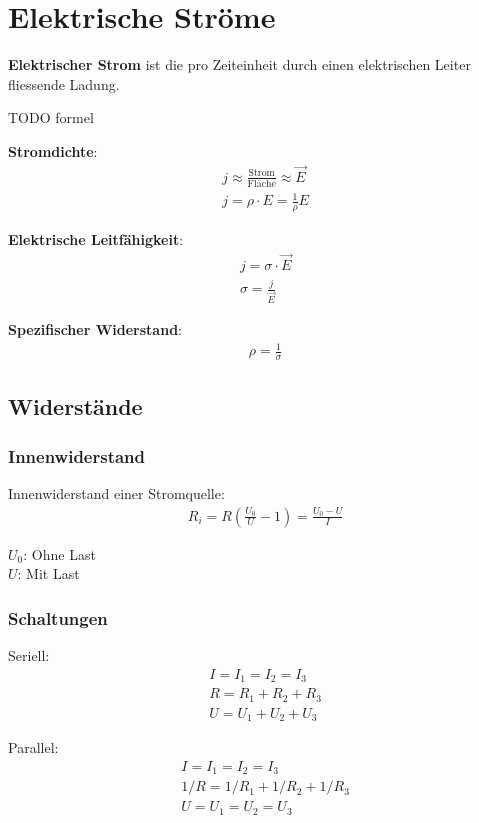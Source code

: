 \section{Elektrische Ströme}

\textbf{Elektrischer Strom} ist die pro Zeiteinheit durch einen elektrischen Leiter
fliessende Ladung.

TODO formel

\textbf{Stromdichte}:
\begin{align*}
	& j \approx \frac{\textrm{Strom}}{\textrm{Fläche}} \approx \vec{E} \\
	& j = \rho \cdot E = \frac{1}{\rho}E
\end{align*}

\textbf{Elektrische Leitfähigkeit}:
\begin{align*}
	& j = \sigma \cdot \vec{E} \\
	& \sigma = \frac{j}{\vec{E}}
\end{align*}

\textbf{Spezifischer Widerstand}:
\begin{align*}
	& \rho = \frac{1}{\sigma}
\end{align*}

\subsection{Widerstände}

\subsubsection{Innenwiderstand}

Innenwiderstand einer Stromquelle:
\begin{align*}
	& R_i = R \left(\frac{U_0}{U} - 1\right) = \frac{U_0 - U}{I}
\end{align*}

$U_0$: Ohne Last\\
$U$: Mit Last

\subsubsection{Schaltungen}

\begin{minipage}[t]{.5\linewidth}
	Seriell:
	\begin{align*}
		& I = I_1 = I_2 = I_3 \\
		& R = R_1 + R_2 + R_3 \\
		& U = U_1 + U_2 + U_3
	\end{align*}
	
\end{minipage}
\begin{minipage}[t]{.5\linewidth}
	Parallel:
	\begin{align*}
		& I = I_1 = I_2 = I_3 \\
		& 1/R = 1/R_1 + 1/R_2 + 1/R_3 \\
		& U = U_1 = U_2 = U_3
	\end{align*}
	
\end{minipage}


